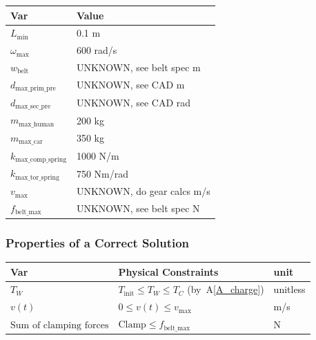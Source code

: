 \documentclass[12pt]{article}
\newcommand{\aref}[1]{A\ref{#1}}
\begin{document}
\begin{table}[!h]
\caption{Specification Parameter Values} \label{TblSpecParams}
\renewcommand{\arraystretch}{1.2}
\noindent \begin{longtable*}{l l} 
  \toprule
  \textbf{Var} & \textbf{Value} \\
  \midrule 
  $L_\text{min}$ & 0.1 \si{\metre}\\
  $\omega_\text{max}$ & 600 rad/s\\
  $w_\text{belt}$ & UNKNOWN, see belt spec m\\
  $d_\text{max\_prim\_pre}$ & UNKNOWN, see CAD m\\
  $d_\text{max\_sec\_pre}$ & UNKNOWN, see CAD rad\\
  $m_\text{max\_human}$ & 200 kg\\
  $m_\text{max\_car}$ & 350 kg\\
  $k_\text{max\_comp\_spring}$ & 1000 N/m\\
  $k_\text{max\_tor\_spring}$ & 750 Nm/rad\\
  $v_\text{max}$ & UNKNOWN, do gear calcs m/s\\
  $f_\text{belt\_max}$ & UNKNOWN, see belt spec N\\
  \bottomrule
\end{longtable*}
\end{table}

\subsubsection{Properties of a Correct Solution} \label{sec_CorrectSolution}

\noindent

\begin{table}[!h]
\caption{Output Variables} \label{TblOutputVar}
\renewcommand{\arraystretch}{1.2}
\noindent \begin{longtable*}{l l l} 
  \toprule
  \textbf{Var} & \textbf{Physical Constraints} & \textbf{unit}\\
  \midrule 
  $T_W$ & $T_\text{init} \leq T_W \leq T_C$ (by~\aref{A_charge}) & unitless\\
  $v(t)$ & $0 \leq v(t) \leq v_\text{max}$& m/s\\
  $\text{Sum of clamping forces}$ & $\text{Clamp} \leq f_\text{belt\_max}$ & N \\
  \bottomrule
\end{longtable*}
\end{table}

\end{document}
